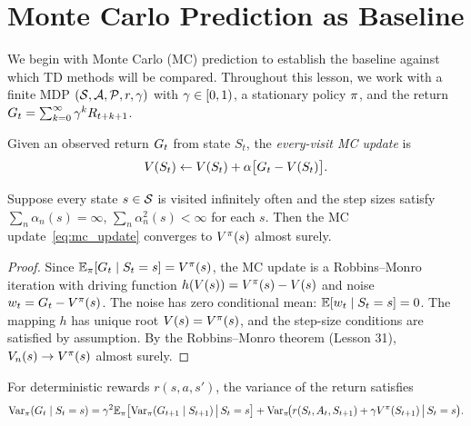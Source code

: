 \documentclass[11pt,a4paper]{article}
\begin{document}
\section{Monte Carlo Prediction as Baseline}
\label{sec:mc}

We begin with Monte Carlo (MC) prediction to establish the baseline
against which TD methods will be compared. Throughout this lesson, we
work with a finite MDP $(\mathcal{S}, \mathcal{A}, \mathcal{P}, r, \gamma)$ with
$\gamma \in [0,1)$, a stationary policy $\pi$, and the return
$G_t = \sum_{k=0}^\infty \gamma^k R_{t+k+1}$.

\begin{definition}
\label{def:mc_update}
Given an observed return $G_t$ from state $S_t$, the
\emph{every-visit MC update} is
\begin{equation}
  V(S_t) \leftarrow V(S_t) + \alpha\bigl[G_t - V(S_t)\bigr].
  \label{eq:mc_update}
\end{equation}
\end{definition}

\begin{proposition}
\label{prop:mc_convergence}
Suppose every state $s \in \mathcal{S}$ is visited infinitely often and the
step sizes satisfy $\sum_n \alpha_n(s) = \infty$,
$\sum_n \alpha_n^2(s) < \infty$ for each $s$. Then the MC
update~\eqref{eq:mc_update} converges to $V^{\pi}(s)$ almost surely.
\end{proposition}

\begin{proof}
Since $\mathbb{E}_\pi[G_t \mid S_t = s] = V^{\pi}(s)$, the MC update is a
Robbins--Monro iteration with driving function
$h(V(s)) = V^{\pi}(s) - V(s)$ and noise $w_t = G_t - V^{\pi}(s)$. The
noise has zero conditional mean: $\mathbb{E}[w_t \mid S_t = s] = 0$. The mapping
$h$ has unique root $V(s) = V^{\pi}(s)$, and the step-size conditions are
satisfied by assumption. By the Robbins--Monro theorem (Lesson 31),
$V_n(s) \to V^{\pi}(s)$ almost surely.
\end{proof}

\begin{lemma}
\label{lem:mc_variance}
For deterministic rewards $r(s,a,s')$, the variance of the return
satisfies
\begin{equation}
  \operatorname{Var}_\pi(G_t \mid S_t = s)
  = \gamma^2 \mathbb{E}_\pi\bigl[\operatorname{Var}_\pi(G_{t+1} \mid S_{t+1})
    \,\big|\, S_t = s\bigr]
  + \operatorname{Var}_\pi\!\bigl(r(S_t, A_t, S_{t+1})
    + \gamma V^{\pi}(S_{t+1}) \,\big|\, S_t = s\bigr).
  \label{eq:mc_variance}
\end{equation}
\end{lemma}
\end{document}
